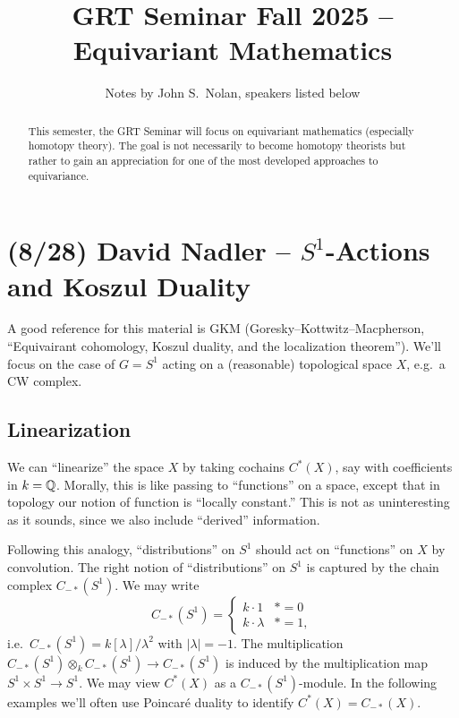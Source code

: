 \documentclass{article}
\title{GRT Seminar Fall 2025 -- Equivariant Mathematics}
\author{Notes by John S.\ Nolan, speakers listed below}
\begin{document}
\maketitle

\begin{abstract}
	This semester, the GRT Seminar will focus on equivariant mathematics (especially homotopy theory).
  The goal is not necessarily to become homotopy theorists but rather to gain an appreciation for one of the most developed approaches to equivariance.
\end{abstract}

\tableofcontents

\section{(8/28) David Nadler -- \texorpdfstring{$S^1$}{S^1}-Actions and Koszul Duality}

A good reference for this material is GKM (Goresky--Kottwitz--Macpherson, ``Equivairant cohomology, Koszul duality, and the localization theorem'').
We'll focus on the case of $G = S^1$ acting on a (reasonable) topological space $X$, e.g.\ a CW complex.

\subsection{Linearization}

We can ``linearize'' the space $X$ by taking cochains $C^*(X)$, say with coefficients in $k = \mathbb{Q}$.
Morally, this is like passing to ``functions'' on a space, except that in topology our notion of function is ``locally constant.''
This is not as uninteresting as it sounds, since we also include ``derived'' information.

Following this analogy, ``distributions'' on $S^1$ should act on ``functions'' on $X$ by convolution.
The right notion of ``distributions'' on $S^1$ is captured by the chain complex $C_{-*}(S^1)$.
We may write
\[
  C_{-*}(S^1) = \begin{cases}
    k \cdot 1 & * = 0 \\
    k \cdot \lambda & * = 1,
  \end{cases}
\]
i.e.\ $C_{-*}(S^1) = k[\lambda] / \lambda^2$ with $|\lambda| = -1$.
The multiplication $C_{-*}(S^1) \otimes_k C_{-*}(S^1) \to C_{-*}(S^1)$ is induced by the multiplication map $S^1 \times S^1 \to S^1$.
We may view $C^*(X)$ as a $C_{-*}(S^1)$-module.
In the following examples we'll often use Poincar\'e duality to identify $C^*(X) = C_{-*}(X)$.
\end{document}
